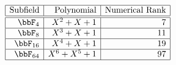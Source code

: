$$
\begin{array}{|r|r|r|}
\hline
\mbox{Subfield} & \mbox{Polynomial} & \mbox{Numerical Rank} \\
\hline
\hline
\bbF_{4} & X^{2} + X + 1 & 7\\
\hline
\bbF_{8} & X^{3} + X + 1 & 11\\
\hline
\bbF_{16} & X^{4} + X + 1 & 19\\
\hline
\bbF_{64} & X^{6} + X^{5} + 1 & 97\\
\hline
\end{array}
$$
